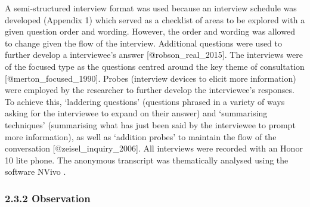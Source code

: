 \documentclass[
]{article}
\begin{document}
A semi-structured interview format was used because an interview
schedule was developed (Appendix 1) which served as a checklist of areas
to be explored with a given question order and wording. However, the
order and wording was allowed to change given the flow of the interview.
Additional questions were used to further develop a interviewee's answer
{[}@robson\_real\_2015{]}. The interviews were of the focused type as
the questions centred around the key theme of consultation
{[}@merton\_focused\_1990{]}. Probes (interview devices to elicit more
information) were employed by the researcher to further develop the
interviewee's responses. To achieve this, `laddering questions'
(questions phrased in a variety of ways asking for the interviewee to
expand on their answer) and `summarising techniques' (summarising what
has just been said by the interviewee to prompt more information), as
well as `addition probes' to maintain the flow of the conversation
{[}@zeisel\_inquiry\_2006{]}. All interviews were recorded with an Honor
10 lite phone. The anonymous transcript was thematically analysed using
the software NVivo .

\hypertarget{observation}{%
\subsubsection{2.3.2 Observation}\label{observation}}
\end{document}
